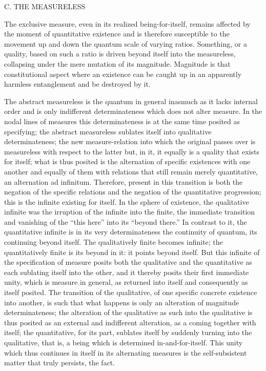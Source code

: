 C. THE MEASURELESS

The exclusive measure, even in its realized being-for-itself,
remains affected by the moment of quantitative existence
and is therefore susceptible to the movement up and down
the quantum scale of varying ratios.
Something, or a quality, based on such a ratio
is driven beyond itself into the measureless,
collapsing under the mere mutation of its magnitude.
Magnitude is that constitutional aspect
where an existence can be caught up
in an apparently harmless entanglement
and be destroyed by it.

The abstract measureless is the quantum in general
inasmuch as it lacks internal order
and is only indifferent determinateness
which does not alter measure.
In the nodal lines of measures this determinateness is
at the same time  posited as specifying;
the abstract measureless sublates itself
into qualitative determinateness;
the new measure-relation into which
the original passes over is measureless
with respect to the latter
but, in it, it equally is a quality that exists for itself;
what is thus posited is the alternation of specific existences
with one another and equally of them with relations
that still remain merely quantitative,
an alternation ad infinitum.
Therefore, present in this transition is
both the negation of the specific relations
and the negation of the quantitative progression;
this is the infinite existing for itself.
In the sphere of existence, the qualitative infinite
was the irruption of the infinite into the finite,
the immediate transition and vanishing of
the “this here” into its “beyond there.”
In contrast to it, the quantitative infinite is
in its very determinateness the continuity of quantum,
its continuing beyond itself.
The qualitatively finite becomes infinite;
the quantitatively finite is its beyond in it:
it points beyond itself.
But this infinite of the specification of measure posits
both the qualitative and the quantitative as
each sublating itself into the other,
and it thereby posits their first immediate unity,
which is measure in general, as returned into itself
and consequently as itself posited.
The transition of the qualitative,
of one specific concrete existence into another,
is such that what happens is only
an alteration of magnitude determinateness;
the alteration of the qualitative
as such into the qualitative is thus posited as
an external and indifferent alteration,
as a coming together with itself;
the quantitative, for its part,
sublates itself by suddenly turning into the qualitative,
that is, a being which is determined in-and-for-itself.
This unity which thus continues in itself
in its alternating measures is
the self-subsistent matter that truly persists,
the fact.

